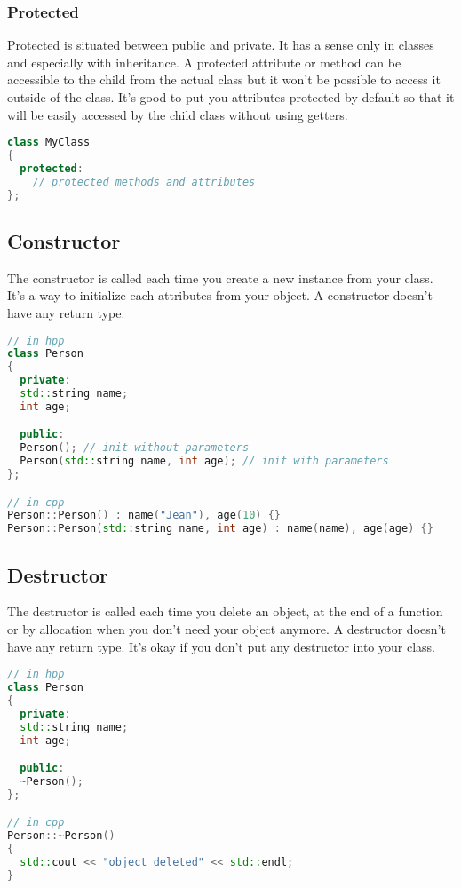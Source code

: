 \documentclass[a4paper, 12pt, titlepage]{scrartcl} %
\begin{document}
\subsubsection{Protected}
Protected is situated between public and private. It has a sense only in classes and especially with inheritance. A protected attribute or method can be accessible to the child from the actual class but it won't be possible to access it outside of the class. It's good to put you attributes protected by default so that it will be easily accessed by the child class without using getters.

\begin{lstlisting}[language=C++]
class MyClass
{
  protected:
    // protected methods and attributes
};
\end{lstlisting} \vspace{5mm}

\subsection{Constructor}
The constructor is called each time you create a new instance from your class. It's a way to initialize each attributes from your object. A constructor doesn't have any return type.

\begin{lstlisting}[language=C++]
// in hpp
class Person
{
  private:
  std::string name;
  int age;

  public:
  Person(); // init without parameters
  Person(std::string name, int age); // init with parameters
};

// in cpp
Person::Person() : name("Jean"), age(10) {}
Person::Person(std::string name, int age) : name(name), age(age) {}
\end{lstlisting} \vspace{5mm}

\subsection{Destructor}
The destructor is called each time you delete an object, at the end of a function or by allocation when you don't need your object anymore. A destructor doesn't have any return type. It's okay if you don't put any destructor into your class.

\begin{lstlisting}[language=C++]
// in hpp
class Person
{
  private:
  std::string name;
  int age;

  public:
  ~Person();
};

// in cpp
Person::~Person()
{
  std::cout << "object deleted" << std::endl;
}
\end{lstlisting} \vspace{5mm}
\end{document}
